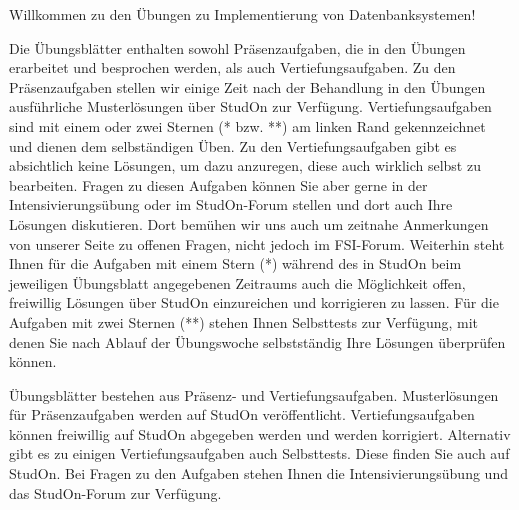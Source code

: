 Willkommen zu den Übungen zu Implementierung von Datenbanksystemen!
\begin{normalText}
Die Übungsblätter enthalten sowohl Präsenzaufgaben, die in den Übungen erarbeitet und besprochen werden, als auch Vertiefungsaufgaben.
Zu den Präsenzaufgaben stellen wir einige Zeit nach der Behandlung in den Übungen ausführliche Musterlösungen über StudOn zur Verfügung.
Vertiefungsaufgaben sind mit einem oder zwei Sternen (* bzw. **) am linken Rand gekennzeichnet und dienen dem selbständigen Üben.
Zu den Vertiefungsaufgaben gibt es absichtlich keine Lösungen, um dazu anzuregen, diese auch wirklich selbst zu bearbeiten.
Fragen zu diesen Aufgaben können Sie aber gerne in der Intensivierungsübung oder im StudOn-Forum stellen und dort auch Ihre Lösungen diskutieren.
Dort bem\"uhen wir uns auch um zeitnahe Anmerkungen von unserer Seite zu offenen Fragen, nicht jedoch im FSI-Forum.
Weiterhin steht Ihnen für die Aufgaben mit einem Stern (*) während des in StudOn beim jeweiligen Übungsblatt angegebenen Zeitraums auch die Möglichkeit offen, freiwillig Lösungen über StudOn einzureichen und korrigieren zu lassen.
Für die Aufgaben mit zwei Sternen (**) stehen Ihnen Selbsttests zur Verfügung, mit denen Sie nach Ablauf der Übungswoche selbstständig Ihre Lösungen überprüfen können.
\end{normalText}
\begin{beamerText}
Übungsblätter bestehen aus Präsenz- und Vertiefungsaufgaben.
Musterlösungen für Präsenzaufgaben werden auf StudOn veröffentlicht.
Vertiefungsaufgaben können freiwillig auf StudOn abgegeben werden und werden korrigiert.
Alternativ gibt es zu einigen Vertiefungsaufgaben auch Selbsttests.
Diese finden Sie auch auf StudOn.
Bei Fragen zu den Aufgaben stehen Ihnen die Intensivierungsübung und das StudOn-Forum zur Verfügung.
\end{beamerText}
